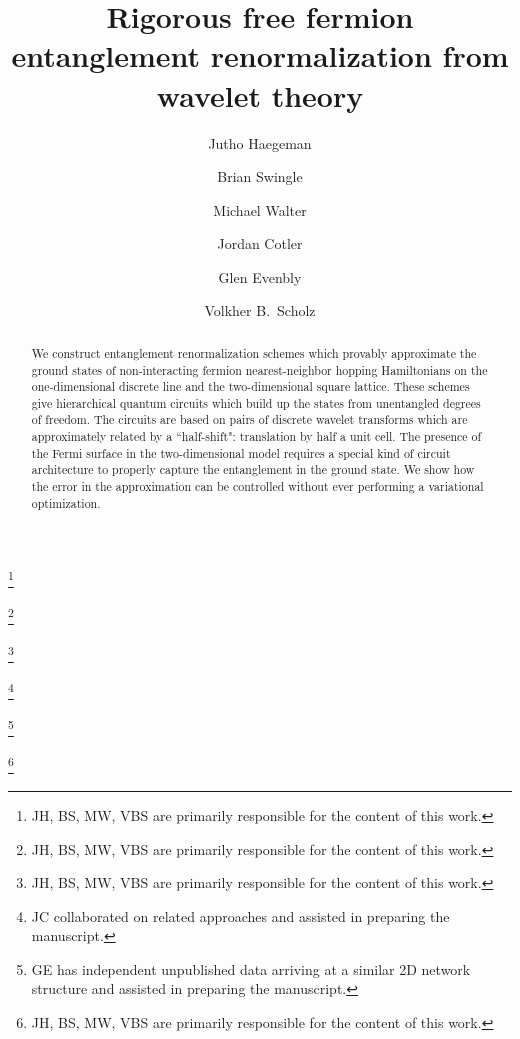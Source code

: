 \documentclass[aps,pra,reprint,superscriptaddress,floatfix,amsmath,amssymb,amsfonts]{revtex4-1}
\begin{document}
\title{Rigorous free fermion entanglement renormalization from wavelet theory}

\author{Jutho Haegeman}
\thanks{JH, BS, MW, VBS are primarily responsible for the content of this work.}

\author{Brian Swingle}
\thanks{JH, BS, MW, VBS are primarily responsible for the content of this work.}

\author{Michael Walter}
\thanks{JH, BS, MW, VBS are primarily responsible for the content of this work.}

\author{Jordan Cotler}
\thanks{JC collaborated on related approaches and assisted in preparing the manuscript.}

\author{Glen Evenbly}
\thanks{GE has independent unpublished data arriving at a similar 2D network structure and assisted in preparing the manuscript.}

\author{Volkher B.~Scholz}
\thanks{JH, BS, MW, VBS are primarily responsible for the content of this work.}

\begin{abstract}
We construct entanglement renormalization schemes which provably approximate the ground states of non-interacting fermion nearest-neighbor hopping Hamiltonians on the one-dimensional discrete line and the two-dimensional square lattice. These schemes give hierarchical quantum circuits which build up the states from unentangled degrees of freedom. The circuits are based on pairs of discrete wavelet transforms which are approximately related by a ``half-shift": translation by half a unit cell. The presence of the Fermi surface in the two-dimensional model requires a special kind of circuit architecture to properly capture the entanglement in the ground state. We show how the error in the approximation can be controlled without ever performing a variational optimization.
\end{abstract}
\end{document}

